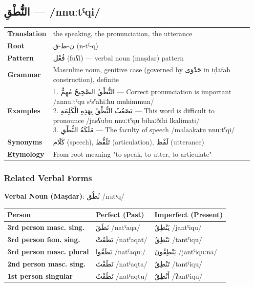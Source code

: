 \documentclass[letterpaper,12pt]{article}
\begin{document}
\subsection{\textarabic{النُّطْقِ} — /nnuːtˤqi/}
\begin{tabular}{p{3cm}p{10cm}}
\toprule
\textbf{Translation} & the speaking, the pronunciation, the utterance \\
\textbf{Root} & \textarabic{ن-ط-ق} (n-tˤ-q) \\
\textbf{Pattern} & \textarabic{فُعْل} (fuʕl) — verbal noun (maṣdar) pattern \\
\textbf{Grammar} & Masculine noun, genitive case (governed by \textarabic{جَدْوَى} in iḍāfah construction), definite \\
\midrule
\textbf{Examples} & \makecell[l]{\parbox{9.5cm}{
1. \textarabic{النُّطْقُ الصَّحِيحُ مُهِمٌّ} — Correct pronunciation is important /annuːtˤqu sˤsˤaħiːħu muhimmun/\\
2. \textarabic{يَصْعُبُ النُّطْقُ بِهَذِهِ الْكَلِمَةِ} — This word is difficult to pronounce /jasʕubu nnuːtˤqu bihaːðihi lkalimati/\\
3. \textarabic{مَلَكَةُ النُّطْقِ} — The faculty of speech /malaakatu nnuːtˤqi/
}} \\
\midrule
\textbf{Synonyms} & \textarabic{كَلَام} (speech), \textarabic{تَلَفُّظ} (articulation), \textarabic{لَفْظ} (utterance) \\
\textbf{Etymology} & From root meaning "to speak, to utter, to articulate" \\
\bottomrule
\end{tabular}

\subsubsection*{Related Verbal Forms}
\par{\large \textbf{Verbal Noun (Maṣdar)}: \textarabic{نُطْق} /nutˤq/}

\begin{longtable}{|>{\raggedright}p{3.5cm}|p{5cm}|p{5cm}|}
\hline
\textbf{Person} & \textbf{Perfect (Past)} & \textbf{Imperfect (Present)} \\
\hline
\textbf{3rd person masc. sing.} & \textarabic{نَطَقَ} /natˤaqa/ & \textarabic{يَنْطِقُ} /jantˤiqu/ \\
\hline
\textbf{3rd person fem. sing.} & \textarabic{نَطَقَتْ} /natˤaqat/ & \textarabic{تَنْطِقُ} /tantˤiqu/ \\
\hline
\textbf{3rd person masc. plural} & \textarabic{نَطَقُوا} /natˤaquː/ & \textarabic{يَنْطِقُونَ} /jantˤiquːna/ \\
\hline
\textbf{2nd person masc. sing.} & \textarabic{نَطَقْتَ} /natˤaqta/ & \textarabic{تَنْطِقُ} /tantˤiqu/ \\
\hline
\textbf{1st person singular} & \textarabic{نَطَقْتُ} /natˤaqtu/ & \textarabic{أَنْطِقُ} /ʔantˤiqu/ \\
\hline
\end{longtable}
\end{document}
